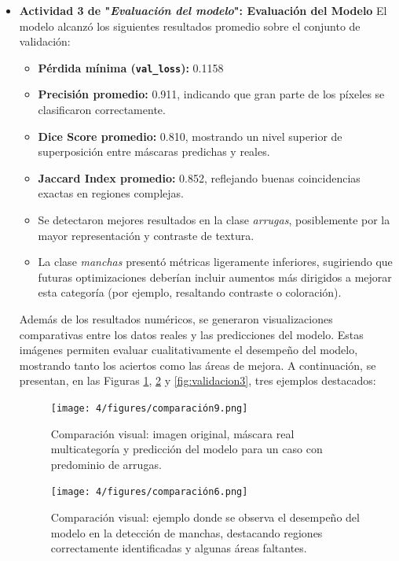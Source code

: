 \begin{enumerate}
\begin{itemize}
  \item\textbf{Actividad 3 de "\textit{Evaluación del modelo}": Evaluación del Modelo}
  El modelo alcanzó los siguientes resultados promedio sobre el conjunto de validación:
\begin{itemize}
  \item \textbf{Pérdida mínima (\texttt{val\_loss}):} 0.1158
  \item \textbf{Precisión promedio:} 0.911, indicando que gran parte de los píxeles se clasificaron correctamente.
  \item \textbf{Dice Score promedio:} 0.810, mostrando un nivel superior de superposición entre máscaras predichas y reales.
  \item \textbf{Jaccard Index promedio:} 0.852, reflejando buenas coincidencias exactas en regiones complejas.
  \item Se detectaron mejores resultados en la clase \emph{arrugas}, posiblemente por la mayor representación y contraste de textura.
  \item La clase \emph{manchas} presentó métricas ligeramente inferiores, sugiriendo que futuras optimizaciones deberían incluir aumentos más dirigidos a mejorar esta categoría (por ejemplo, resaltando contraste o coloración).
\end{itemize}

\vspace{0.5cm}

Además de los resultados numéricos, se generaron visualizaciones comparativas entre los datos reales y las predicciones del modelo. Estas imágenes permiten evaluar cualitativamente el desempeño del modelo, mostrando tanto los aciertos como las áreas de mejora. A continuación, se presentan, en las Figuras \ref{fig:validacion1}, \ref{fig:validacion2} y \ref{fig:validacion3}, tres ejemplos destacados:

\vspace{0.5cm}

\begin{figure}[H]
\centering
\texttt{[image: 4/figures/comparación9.png]}
\caption{Comparación visual: imagen original, máscara real multicategoría y predicción del modelo para un caso con predominio de arrugas.}
\label{fig:validacion1}
\end{figure}

\begin{figure}[H]
\centering
\texttt{[image: 4/figures/comparación6.png]}
\caption{Comparación visual: ejemplo donde se observa el desempeño del modelo en la detección de manchas, destacando regiones correctamente identificadas y algunas áreas faltantes.}
\label{fig:validacion2}
\end{figure}


\end{itemize}
\end{enumerate}
